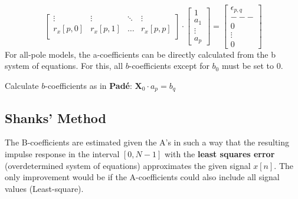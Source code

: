 \begin{aufzaehlung}
$$\begin{bmatrix}
    		\vdots & \vdots & \ddots & \vdots \\                             
    		r_x[p,0] & r_x[p,1] & \hdots & r_x[p,p] \\                        
		\end{bmatrix} \cdot 
		\begin{bmatrix}
    		1 \\
    		a_1 \\
    		\vdots \\
    		a_p
		\end{bmatrix} = \begin{bmatrix}
    		\epsilon_{p,q} \\
    		---\\
    		0 \\
    		\vdots \\
    		0
		\end{bmatrix} $$ 
		For all-pole models, the a-coefficients can be directly calculated from the b system of equations. 
		For this, all $b$-coefficients except for $b_0$ must be set to 0.
	\item Calculate $b$-coefficients as in \textbf{Padé}: $\bm X_0 \cdot a_p = b_q$
		\normalsize
\end{aufzaehlung}
	
\subsection{Shanks' Method }

The B-coefficients are estimated given the A's in such a way that the resulting impulse response in the interval $[0, N - 1]$ with the
\textbf{least squares error} (overdetermined system of equations) approximates the given
signal $x[n]$. The only improvement would be if the A-coefficients could also include all signal values (Least-square).

